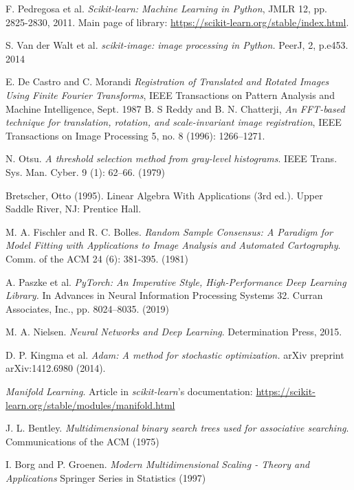 \documentclass[11pt, a4paper, twoside]{article} %
\begin{document}
\begin{thebibliography}{1}
F. Pedregosa et al. {\em Scikit-learn: Machine Learning in Python}, JMLR 12, pp. 2825-2830, 2011. Main page of library: \href{https://scikit-learn.org/stable/index.html}{https://scikit-learn.org/stable/index.html}.

S. Van der Walt et al. {\em scikit-image: image processing in Python.} PeerJ, 2, p.e453. 2014

E. De Castro and C. Morandi {\em Registration of Translated and Rotated Images Using Finite Fourier Transforms}, IEEE Transactions on Pattern Analysis and Machine Intelligence, Sept. 1987
 B. S Reddy and B. N. Chatterji, {\em An FFT-based technique for translation, rotation, and scale-invariant image registration}, IEEE Transactions on Image Processing 5, no. 8 (1996): 1266–1271.
 
N. Otsu. {\em A threshold selection method from gray-level histograms}. IEEE Trans. Sys. Man. Cyber. 9 (1): 62–66. (1979)

Bretscher, Otto (1995). Linear Algebra With Applications (3rd ed.). Upper Saddle River, NJ: Prentice Hall.


M. A. Fischler and R. C. Bolles. {\em Random Sample Consensus: A Paradigm for Model Fitting with Applications to Image Analysis and Automated Cartography}. Comm. of the ACM 24 (6): 381-395. (1981)

A. Paszke et al. {\em PyTorch: An Imperative Style, High-Performance Deep Learning Library.} In Advances in Neural Information Processing Systems 32. Curran Associates, Inc., pp. 8024–8035. (2019)

M. A. Nielsen. {\em Neural Networks and Deep Learning}. Determination Press, 2015.

D. P. Kingma et al. {\em Adam: A method for stochastic optimization.} arXiv preprint arXiv:1412.6980 (2014).

{\em Manifold Learning}. Article in {\em scikit-learn}'s documentation: \href{https://scikit-learn.org/stable/modules/manifold.html}{https://scikit-learn.org/stable/modules/manifold.html}

J. L. Bentley. {\em Multidimensional binary search trees used for associative searching}. Communications of the ACM (1975)

I. Borg and P. Groenen. {\em Modern Multidimensional Scaling - Theory and Applications} Springer Series in Statistics (1997)


\end{thebibliography}
\end{document}
